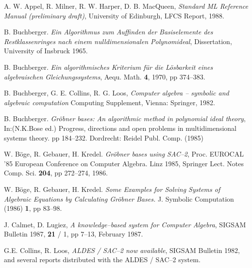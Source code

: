 \begin{thebibliography}{Stoutemyer 86}

 A. W. Appel, R. Milner, 
        R. W. Harper, D. B. MacQueen,
        {\em Standard ML Reference Manual (preliminary draft)},
        University of Edinburgh, LFCS Report, 1988.

 B. Buchberger.
        {\em Ein Algorithmus zum Auffinden der Basiselemente des
        Restklassenringes nach einem nulldimensionalen
        Polynomideal},
        Dissertation, University of Insbruck 1965.

 B. Buchberger.
        {\em Ein algorithmisches Kriterium f\"ur die L\"osbarkeit
        eines algebraischen Gleichungssystems},
        Aequ. Math. {\bf 4}, 1970, pp 374--383.

 B. Buchberger, 
        G. E. Collins, R. G. Loos,
        {\em Computer algebra -- symbolic and algebraic computation}
        Computing Supplement,
        Vienna: Springer, 1982.

 B. Buchberger.
        {\em Gr\"obner bases: An algorithmic method in
        polynomial ideal theory},
        In:(N.K.Bose ed.) Progress, directions and open problems
        in multidimensional systems theory. pp 184--232.
        Dordrecht: Reidel Publ. Comp. (1985)

 W. B\"oge, R. Gebauer, H. Kredel.
        {\em Gr\"obner bases using SAC--2},
        Proc. EUROCAL '85
        European Conference on Computer Algebra.
        Linz 1985,
        Springer Lect. Notes Comp. Sci. {\bf 204}, pp 272--274, 1986.

 W. B\"oge, R. Gebauer, H. Kredel.
        {\em Some Examples for Solving Systems of Algebraic
        Equations by Calculating Gr\"obner Bases.}
        J. Symbolic Computation (1986) {\bf 1}, pp 83--98.

 J. Calmet, D. Lugiez,
        {\em A knowledge--based system for Computer Algebra},
        SIGSAM Bulletin 1987, {\bf 21} / 1, pp 7--13, February 1987.

 G.E. Collins, R. Loos,
        {\em ALDES / SAC--2 now available},
        SIGSAM Bulletin 1982, and several reports distributed
        with the ALDES / SAC--2 system.


\end{thebibliography}
